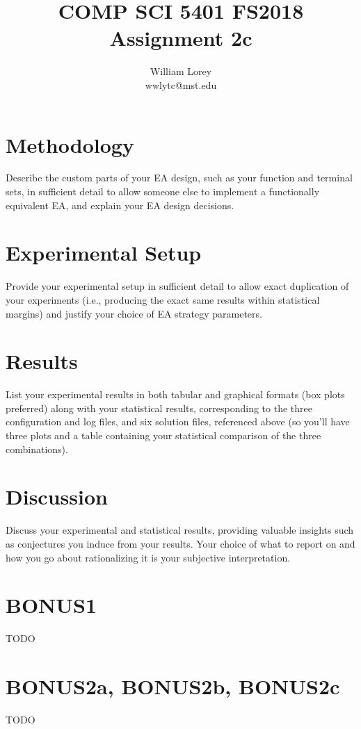 \documentclass[11pt]{article}
\title{COMP SCI 5401 FS2018 Assignment 2c}
\author{William  Lorey \\ wwlytc@mst.edu}
\date{}
\begin{document}
\maketitle

\tableofcontents

\section{Methodology}
Describe the custom parts of your EA design, such as your function and terminal sets,
in sufficient detail to allow someone else to implement a functionally equivalent EA, and explain
your EA design decisions.

\section{Experimental Setup}
Provide your experimental setup in sufficient detail to allow exact duplication
of your experiments (i.e., producing the exact same results within statistical margins) and justify
your choice of EA strategy parameters.

\section{Results}
List your experimental results in both tabular and graphical formats (box plots preferred)
along with your statistical results, corresponding to the three configuration and log files, and six
solution files, referenced above (so you’ll have three plots and a table containing your statistical
comparison of the three combinations).

\section{Discussion}
Discuss your experimental and statistical results, providing valuable insights such as conjectures
you induce from your results. Your choice of what to report on and how you go about
rationalizing it is your subjective interpretation.

\section{BONUS1}
TODO

\section{BONUS2a, BONUS2b, BONUS2c} %
TODO
\end{document}
